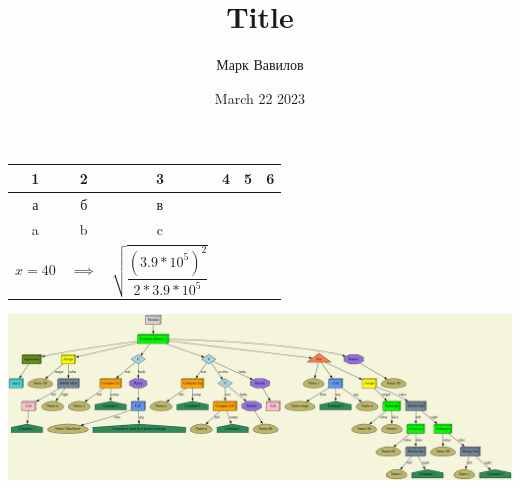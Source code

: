 \documentclass[12pt]{article}
\title{Title}
\author{Марк Вавилов}
\date{March 22 2023}
\begin{document}
\maketitle

\begin{tabular} { c | c | c | c | c | c }
1 & 2 & 3 & 4 & 5 & 6 \\ 
\hline
а & б & в &  &  &  \\ 
\hline
a & b & c &  &  &  \\ 
\hline
$x=40$ & $\implies $ & $\sqrt{\dfrac{(3.9*10^5)^2}{2*3.9*10^5}}$ &  &  &  \\
\end{tabular}

\includegraphics[scale=0.2]{../artifacts/graph.png}\\
\end{document}
